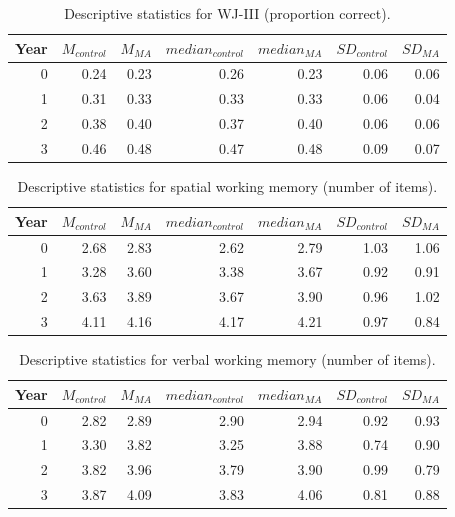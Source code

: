 \documentclass[11pt]{article}
\begin{document}
\begin{table}[H]
\centering
\begin{tabular}{rrrrrrr}
  \hline
Year & $M_{control}$ & $M_{MA}$ & $median_{control}$ & $median_{MA}$ & $SD_{control}$ & $SD_{MA}$ \\ 
  \hline
  0 & 0.24 & 0.23 & 0.26 & 0.23 & 0.06 & 0.06 \\ 
    1 & 0.31 & 0.33 & 0.33 & 0.33 & 0.06 & 0.04 \\ 
    2 & 0.38 & 0.40 & 0.37 & 0.40 & 0.06 & 0.06 \\ 
    3 & 0.46 & 0.48 & 0.47 & 0.48 & 0.09 & 0.07 \\ 
   \hline
\end{tabular}
\caption{Descriptive statistics for WJ-III (proportion correct).} 
\label{tab:woodcock}
\end{table}
\begin{table}[H]
\centering
\begin{tabular}{rrrrrrr}
  \hline
Year & $M_{control}$ & $M_{MA}$ & $median_{control}$ & $median_{MA}$ & $SD_{control}$ & $SD_{MA}$ \\ 
  \hline
  0 & 2.68 & 2.83 & 2.62 & 2.79 & 1.03 & 1.06 \\ 
    1 & 3.28 & 3.60 & 3.38 & 3.67 & 0.92 & 0.91 \\ 
    2 & 3.63 & 3.89 & 3.67 & 3.90 & 0.96 & 1.02 \\ 
    3 & 4.11 & 4.16 & 4.17 & 4.21 & 0.97 & 0.84 \\ 
   \hline
\end{tabular}
\caption{Descriptive statistics for spatial working memory (number of items).} 
\label{tab:spatialwm}
\end{table}
\begin{table}[H]
\centering
\begin{tabular}{rrrrrrr}
  \hline
Year & $M_{control}$ & $M_{MA}$ & $median_{control}$ & $median_{MA}$ & $SD_{control}$ & $SD_{MA}$ \\ 
  \hline
  0 & 2.82 & 2.89 & 2.90 & 2.94 & 0.92 & 0.93 \\ 
    1 & 3.30 & 3.82 & 3.25 & 3.88 & 0.74 & 0.90 \\ 
    2 & 3.82 & 3.96 & 3.79 & 3.90 & 0.99 & 0.79 \\ 
    3 & 3.87 & 4.09 & 3.83 & 4.06 & 0.81 & 0.88 \\ 
   \hline
\end{tabular}
\caption{Descriptive statistics for verbal working memory (number of items).} 
\label{tab:verbalwm}
\end{table}
\end{document}
